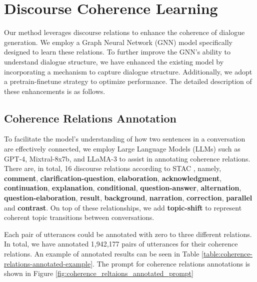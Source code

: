 \section{Discourse Coherence Learning}
\label{sec:discourse_coherene_learning}
Our method leverages discourse relations to enhance the coherence of dialogue generation. We employ a Graph Neural Network (GNN) model specifically designed to learn these relations. To further improve the GNN's ability to understand dialogue structure, we have enhanced the existing model by incorporating a mechanism to capture dialogue structure. Additionally, we adopt a pretrain-finetune strategy to optimize performance. The detailed description of these enhancements is as follows.

\subsection{Coherence Relations Annotation} \label{sec:coherence_reltaions_annotation}
To facilitate the model's understanding of how two sentences in a conversation are effectively connected, we employ Large Language Models (LLMs) such as GPT-4, Mixtral-8x7b, and LLaMA-3 to assist in annotating coherence relations. There are, in total, 16 discourse relations according to STAC \cite{asher-etal-2016-discourse}, namely, \textbf{comment}, \textbf{clarification-question}, \textbf{elaboration}, \textbf{acknowledgment}, \textbf{continuation}, \textbf{explanation}, \textbf{conditional}, \textbf{question-answer}, \textbf{alternation}, \textbf{question-elaboration}, \textbf{result}, \textbf{background}, \textbf{narration}, \textbf{correction}, \textbf{parallel} and \textbf{contrast}. On top of these relationships, we add \textbf{topic-shift} to represent coherent topic transitions between conversations. 

Each pair of utterances could be annotated with zero to three different relations. In total, we have annotated 1,942,177 pairs of utterances for their coherence relations. An example of annotated results can be seen in Table \ref{table:coherence-relations-annotated-example}. The prompt for coherence relations annotations is shown in Figure \ref{fig:coherence_reltaions_annotated_prompt}

